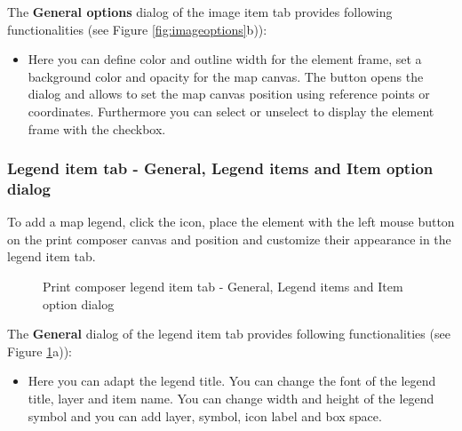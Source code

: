 
The \textbf{General options} dialog of the image item tab provides following
functionalities (see Figure \ref{fig:imageoptions}b)):

\begin{itemize}
\item Here you can define color and outline width for the element frame, set
a background color and opacity for the map canvas. The 
button opens the  dialog and allows to set the map
canvas position using reference points or coordinates. Furthermore you can
select or unselect to display the element frame with the  checkbox.
\end{itemize}

\subsubsection{Legend item tab - General, Legend items and Item option dialog }

To add a map legend, click the 
icon, place the element with the left mouse button on the print composer
canvas and position and customize their appearance in the legend item tab.

\begin{figure}[h]
\centering
\caption{Print composer legend item tab - General, Legend items and Item
option dialog\nixcaption}\label{fig:legendoptions}
   \goodgap
   \goodgap
\end{figure}


The \textbf{General} dialog of the legend item tab provides following
functionalities (see Figure \ref{fig:legendoptions}a)):

\begin{itemize}
\item Here you can adapt the legend title. You can change the font of the
legend title, layer and item name. You can change width and height of the
legend symbol and you can add layer, symbol, icon label and box space.
\end{itemize}

